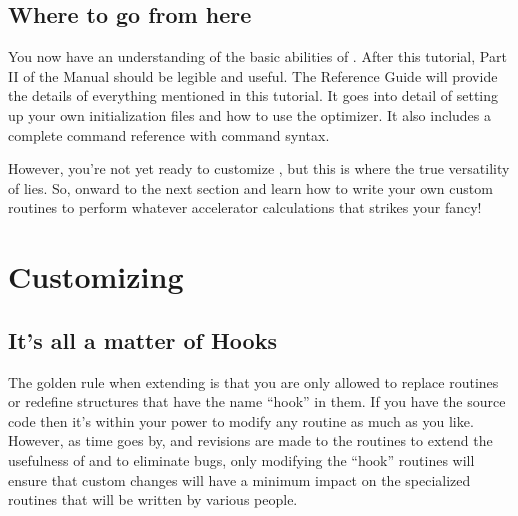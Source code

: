 
\section{Where to go from here}
\label{s:where_to_go}

You now have an understanding of the basic abilities of \tao. After this
tutorial, Part II of the \tao Manual should be legible and useful.
The Reference Guide will provide the details of everything mentioned in this tutorial. 
It goes into detail of setting up your own initialization
files and how to use the optimizer. It also includes a complete command
reference with command syntax.

However, you're not yet ready to customize \tao, but this is where the true versatility
of \tao lies. So, onward to the next section and learn how to write your
own custom routines to perform whatever accelerator calculations that strikes your
fancy!

\chapter{Customizing \tao}
\label{c:custom_tao}

\section{It's all a matter of Hooks}

The golden rule when extending \tao is that you are only allowed to replace
routines or redefine structures that have the name ``hook'' in them. 
If you have the source code then it's within your power to modify any routine as much 
as you like. However, as time
goes by, and revisions are made to the \tao routines to extend the
usefulness of \tao and to eliminate bugs, only modifying the ``hook'' routines
will ensure that custom changes will
have a minimum impact on the specialized routines that will be written
by various people. 

